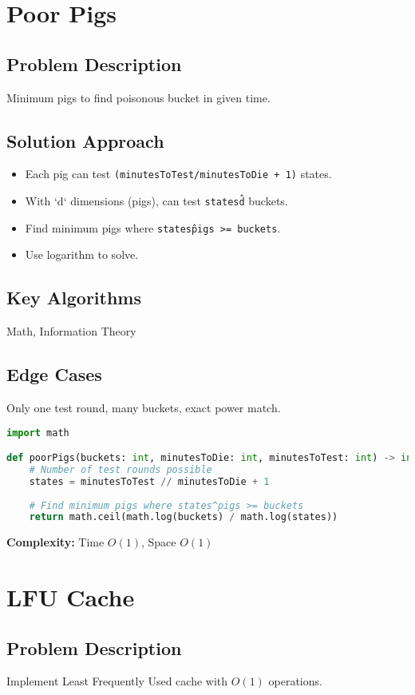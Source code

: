 \documentclass[10pt, a4paper]{article}
\begin{document}
\section{Poor Pigs}
\subsection*{Problem Description}
Minimum pigs to find poisonous bucket in given time.

\subsection*{Solution Approach}
\begin{itemize}
    \item Each pig can test \texttt{(minutesToTest/minutesToDie + 1)} states.
    \item With `d` dimensions (pigs), can test \texttt{states\^d} buckets.
    \item Find minimum pigs where \texttt{states\^pigs >= buckets}.
    \item Use logarithm to solve.
\end{itemize}

\subsection*{Key Algorithms}
Math, Information Theory

\subsection*{Edge Cases}
Only one test round, many buckets, exact power match.

\begin{lstlisting}[language=Python]
import math

def poorPigs(buckets: int, minutesToDie: int, minutesToTest: int) -> int:
    # Number of test rounds possible
    states = minutesToTest // minutesToDie + 1
    
    # Find minimum pigs where states^pigs >= buckets
    return math.ceil(math.log(buckets) / math.log(states))
\end{lstlisting}
\textbf{Complexity:} Time $O(1)$, Space $O(1)$

\section{LFU Cache}
\subsection*{Problem Description}
Implement Least Frequently Used cache with $O(1)$ operations.
\end{document}
